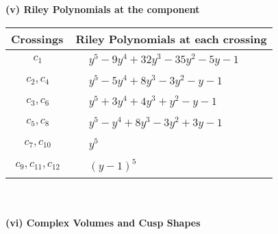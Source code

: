 \documentclass[1p]{elsarticle_modified}
\theoremstyle{definition}
\begin{document}
\newpage\renewcommand{\arraystretch}{1}
\flushleft \textbf{(v) Riley Polynomials at the component}\newline \\
\begin{tabular}{m{50pt}|m{274pt}}
Crossings & \hspace{64pt}Riley Polynomials at each crossing \\
\hline $$\begin{aligned}c_{1}\end{aligned}$$&$\begin{aligned}
&y^5-9 y^4+32 y^3-35 y^2-5 y-1
\end{aligned}$\\
\hline $$\begin{aligned}c_{2},c_{4}\end{aligned}$$&$\begin{aligned}
&y^5-5 y^4+8 y^3-3 y^2- y-1
\end{aligned}$\\
\hline $$\begin{aligned}c_{3},c_{6}\end{aligned}$$&$\begin{aligned}
&y^5+3 y^4+4 y^3+y^2- y-1
\end{aligned}$\\
\hline $$\begin{aligned}c_{5},c_{8}\end{aligned}$$&$\begin{aligned}
&y^5- y^4+8 y^3-3 y^2+3 y-1
\end{aligned}$\\
\hline $$\begin{aligned}c_{7},c_{10}\end{aligned}$$&$\begin{aligned}
&y^5
\end{aligned}$\\
\hline $$\begin{aligned}c_{9},c_{11},c_{12}\end{aligned}$$&$\begin{aligned}
&(y-1)^5
\end{aligned}$\\
\hline
\end{tabular}\\~\\
\newpage\flushleft \textbf{(vi) Complex Volumes and Cusp Shapes}
\end{document}
